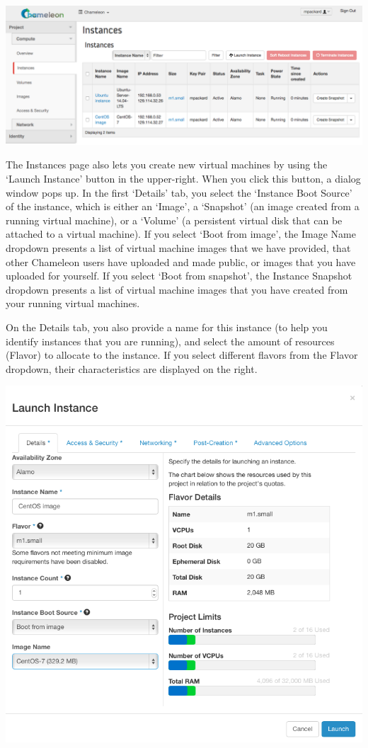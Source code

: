 \includegraphics[width=\columnwidth]{images/chameleon/openstack_alamo_instances.png}

The Instances page also lets you create new virtual machines by using
the `Launch Instance' button in the upper-right. When you click this
button, a dialog window pops up. In the first `Details' tab, you select
the `Instance Boot Source' of the instance, which is either an `Image',
a `Snapshot' (an image created from a running virtual machine), or a
`Volume' (a persistent virtual disk that can be attached to a virtual
machine). If you select `Boot from image', the Image Name dropdown
presents a list of virtual machine images that we have provided, that
other Chameleon users have uploaded and made public, or images that you
have uploaded for yourself. If you select `Boot from snapshot', the
Instance Snapshot dropdown presents a list of virtual machine images
that you have created from your running virtual machines.

On the Details tab, you also provide a name for this instance (to help
you identify instances that you are running), and select the amount of
resources (Flavor) to allocate to the instance. If you select different
flavors from the Flavor dropdown, their characteristics are displayed on
the right.

\includegraphics[width=\columnwidth]{images/chameleon/openstack_alamo_launch_details.png}

